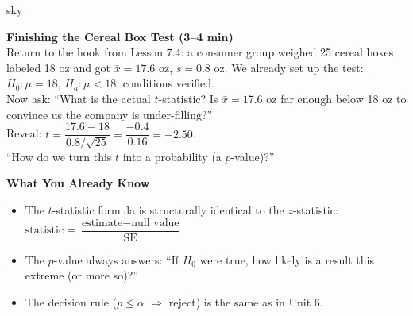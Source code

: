 \documentclass[10pt]{article}
\begin{document}
\begin{skillbox}[Hook]{sky}
\begin{minipage}[t]{0.55\linewidth}
    \textbf{Finishing the Cereal Box Test (3--4 min)}\\
    Return to the hook from Lesson 7.4: a consumer group weighed 25 cereal boxes labeled
    18 oz and got $\bar x = 17.6$ oz, $s = 0.8$ oz. We already set up the test:
    $H_0: \mu = 18$, $H_a: \mu < 18$, conditions verified.\\[4pt]
    Now ask: ``What is the actual $t$-statistic? Is $\bar x = 17.6$ oz far enough below 18 oz
    to convince us the company is under-filling?''\\[4pt]
    Reveal: $t = \dfrac{17.6 - 18}{0.8/\sqrt{25}} = \dfrac{-0.4}{0.16} = -2.50$.\\[4pt]
    ``How do we turn this $t$ into a probability (a $p$-value)?''
\end{minipage}
\hfill
\begin{minipage}[t]{0.40\linewidth}
    \textbf{What You Already Know}
    \begin{itemize}
        \item The $t$-statistic formula is structurally identical to the $z$-statistic:
              $\text{statistic} = \dfrac{\text{estimate} - \text{null value}}{\text{SE}}$
        \item The $p$-value always answers: ``If $H_0$ were true, how likely is a result
              this extreme (or more so)?''
        \item The decision rule ($p \le \alpha$ $\Rightarrow$ reject) is the same as
              in Unit 6.
    \end{itemize}
\end{minipage}
\end{skillbox}
\end{document}
